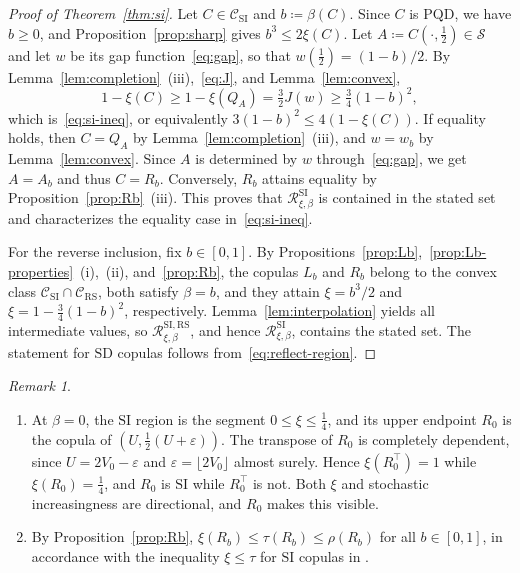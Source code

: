 \documentclass[twocolumn,a4paper]{article}
\numberwithin{equation}{section}
\theoremstyle{remark}
\newtheorem{remark}[theorem]{Remark}
\newcommand{\CC}{\mathcal{C}}
\newcommand{\RR}{\mathcal{R}}
\newcommand{\1}{\mathbf{1}}
\newcommand{\PQD}{\mathrm{PQD}}
\newcommand{\SI}{\mathrm{SI}}
\newcommand{\SD}{\mathrm{SD}}
\newcommand{\RS}{\mathrm{RS}}
\begin{document}
\begin{proof}[Proof of Theorem~\ref{thm:si}]
Let \(C\in\CC_{\SI}\) and \(b\coloneqq\beta(C)\).
Since \(C\) is \(\PQD\), we have \(b\ge0\), and Proposition~\ref{prop:sharp} gives \(b^3\le2\xi(C)\).
Let \(A\coloneqq C(\cdot,\tfrac12)\in\mathcal S\) and let \(w\) be its gap function~\eqref{eq:gap}, so that \(w(\tfrac12)=(1-b)/2\).
By Lemma~\ref{lem:completion}~(iii),~\eqref{eq:J}, and Lemma~\ref{lem:convex},
\[
1-\xi(C)\ge1-\xi(Q_A)=\tfrac32J(w)\ge\tfrac34(1-b)^2,
\]
which is~\eqref{eq:si-ineq}, or equivalently \(3(1-b)^2\le4(1-\xi(C))\).
If equality holds, then \(C=Q_A\) by Lemma~\ref{lem:completion}~(iii), and \(w=w_b\) by Lemma~\ref{lem:convex}.
Since \(A\) is determined by \(w\) through~\eqref{eq:gap}, we get \(A=A_b\) and thus \(C=R_b\).
Conversely, \(R_b\) attains equality by Proposition~\ref{prop:Rb}~(iii).
This proves that \(\RR^{\SI}_{\xi,\beta}\) is contained in the stated set and characterizes the equality case in~\eqref{eq:si-ineq}.

For the reverse inclusion, fix \(b\in[0,1]\).
By Propositions~\ref{prop:Lb},~\ref{prop:Lb-properties}~(i),~(ii), and~\ref{prop:Rb}, the copulas \(L_b\) and \(R_b\) belong to the convex class \(\CC_{\SI}\cap\CC_{\RS}\), both satisfy \(\beta=b\), and they attain \(\xi=b^3/2\) and \(\xi=1-\tfrac34(1-b)^2\), respectively.
Lemma~\ref{lem:interpolation} yields all intermediate values, so \(\RR^{\SI,\RS}_{\xi,\beta}\), and hence \(\RR^{\SI}_{\xi,\beta}\), contains the stated set.
The statement for \(\SD\) copulas follows from~\eqref{eq:reflect-region}.
\end{proof}

\begin{remark}\label{rem:R0}
\begin{enumerate}[label=(\alph*),leftmargin=*]
\item At \(\beta=0\), the \(\SI\) region is the segment \(0\le\xi\le\tfrac14\), and its upper endpoint \(R_0\) is the copula of \((U,\tfrac12(U+\varepsilon))\).
The transpose of \(R_0\) is completely dependent, since \(U=2V_0-\varepsilon\) and \(\varepsilon=\lfloor2V_0\rfloor\) almost surely.
Hence \(\xi(R_0^\top)=1\) while \(\xi(R_0)=\tfrac14\), and \(R_0\) is \(\SI\) while \(R_0^\top\) is not.
Both \(\xi\) and stochastic increasingness are directional, and \(R_0\) makes this visible.
\item By Proposition~\ref{prop:Rb}, \(\xi(R_b)\le\tau(R_b)\le\rho(R_b)\) for all \(b\in[0,1]\), in accordance with the inequality \(\xi\le\tau\) for \(\SI\) copulas in \cite[Thm.~1.1]{rockel2026kendall}.
\end{enumerate}
\end{remark}
\end{document}

